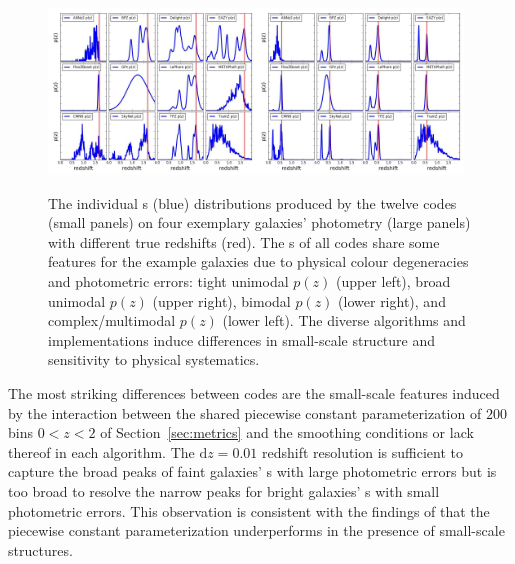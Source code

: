\begin{figure}
\includegraphics[width=0.49\textwidth]{fig/pz_12codes_713178_noseaborn_crop.jpg}\includegraphics[width=0.49\textwidth]{fig/pz_12codes_982747_noseaborn_crop.jpg}
\caption{The individual \pzpdf s (blue) distributions produced by the twelve codes (small panels) on four exemplary galaxies' photometry (large panels) with different true redshifts (red).
The \pzpdf s of all codes share some features for the example galaxies due to physical colour degeneracies and photometric errors: tight unimodal $p(z)$ (upper left), broad unimodal $p(z)$ (upper right), bimodal $p(z)$ (lower right), and complex/multimodal $p(z)$ (lower left).
The diverse algorithms and implementations induce differences in small-scale structure and sensitivity to physical systematics.}
\label{fig:pz_examples}
\end{figure}

The most striking differences between codes are the small-scale features induced by the interaction between the shared piecewise constant parameterization of $200$ bins $0 < z < 2$ of Section~\ref{sec:metrics} and the smoothing conditions or lack thereof in each algorithm.
The $\mathrm{d}z = 0.01$ redshift resolution is sufficient to capture the broad peaks of faint galaxies' \pzpdf s with large photometric errors but is too broad to resolve the narrow peaks for bright galaxies' \pzpdf s with small photometric errors.
This observation is consistent with the findings of \citet[]{Malz:2018} that the piecewise constant parameterization underperforms in the presence of small-scale structures.

